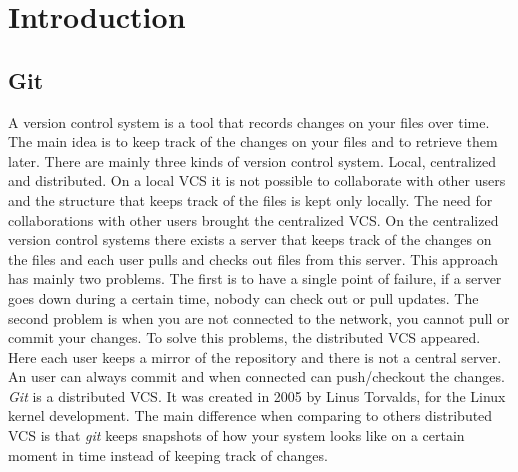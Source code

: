 \section{Introduction}
\subsection{Git}
A version control system is a tool that records changes on your
files over time. The main idea is to keep track of the changes on your
files and to retrieve them later. There are mainly three kinds of 
version control system. Local, centralized and distributed. On
a local VCS it is not possible to collaborate with other users and
the structure that keeps track of the files is kept only locally. The
need for collaborations with other users brought the centralized VCS.
On the centralized version control systems there exists a server that keeps
track of the changes on the files and each user pulls and checks out files
from this server. This approach has mainly two problems. The
first is to have a single point of failure, if a server goes down
during a certain time, nobody can check out or pull updates. The
second problem is when you are not connected to the network, you
cannot pull or commit your changes. To solve this problems, the
distributed VCS appeared. Here each user keeps a mirror of the
repository and there is not a central server. An user can always commit
and when connected can push/checkout the changes.\\

\emph{Git} is a distributed VCS. It was created in 2005 by Linus Torvalds,
for the Linux kernel development. The main difference when comparing to
others distributed VCS is that \emph{git} keeps snapshots of how your system
looks like on a certain moment in time instead of keeping track of
changes.\par
